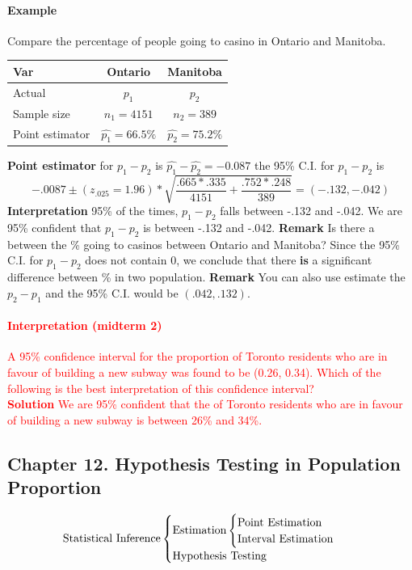 \documentclass{article}
\begin{document}
		\paragraph{Example} Compare the percentage of people going to casino in Ontario and Manitoba.
			\begin{center}
				\begin{tabular}{l|cc}
				  Var & Ontario & Manitoba \\
				  \hline
				  Actual & $p_1$ & $p_2$ \\
				  Sample size & $n_1=4151$ & $n_2=389$ \\
				  Point estimator & $\hat{p_1}=66.5\%$ & $\hat{p_2}=75.2\%$
				\end{tabular}
			\end{center}
			\quad \textbf{Point estimator} for $p_1 - p_2$ is $\hat{p_1} - \hat{p_2} = -0.087$
			\newline the 95\% C.I. for $p_1 - p_2$ is
				\[
					-.0087 \pm (z_{.025}=1.96) * \sqrt{\frac{.665 * .335}{4151} + \frac{.752 * .248}{389}} = (-.132, -.042)
				\]
			\newline \textbf{Interpretation} 95\% of the times, $p_1 - p_2$ falls between -.132 and -.042. We are 95\% confident that $p_1 - p_2$ is between -.132 and -.042.
			\newline \textbf{Remark} Is there a  between the \% going to casinos between Ontario and Manitoba? Since the 95\% C.I. for $p_1 - p_2$ does not contain 0, we conclude that there \textbf{is} a significant difference between \% in two population.
			\newline \textbf{Remark} You can also use estimate the $p_2 - p_1$ and the 95\% C.I. would be $(.042, .132)$.
			
		\textcolor{red}{
			\paragraph{Interpretation (midterm 2)}
			A 95\% confidence interval for the proportion of Toronto residents who are in favour of building a new subway was found to be (0.26, 0.34). Which of the following is the best interpretation of this confidence interval?
			\\
			\textbf{Solution} We are 95\% confident that the  of Toronto residents who are in favour of building a new subway is between 26\% and 34\%.
		}
		
		\subsection{Chapter 12. Hypothesis Testing in Population Proportion}
		\[
			\text{{Statistical Inference}}
			\begin{cases}
				\text{{Estimation}}
					\begin{cases}	
						\text{{Point Estimation}} \\
						\text{{Interval Estimation}}
					\end{cases}\\
				\text{{Hypothesis Testing}}
			\end{cases}
		\]
\end{document}
